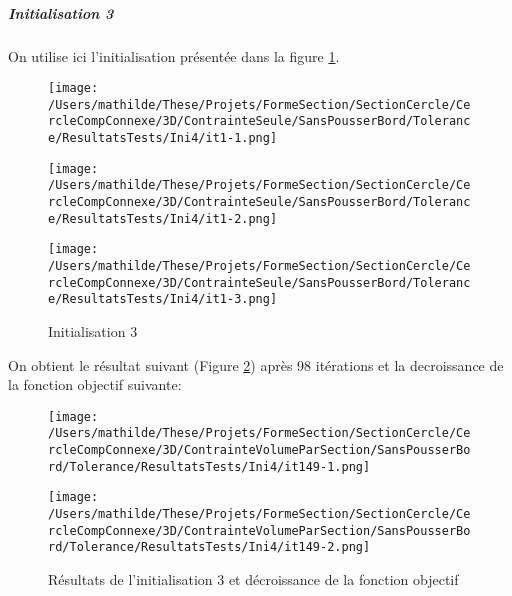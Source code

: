 \documentclass[11pt,a4paper]{article}
\begin{document}
	

\subparagraph{Initialisation 3} On utilise ici l'initialisation présentée dans la figure \ref{fig:cerclevol3Dini3}.

\begin{figure}[H]
	\label{fig:cerclevol3Dini3}
	\begin{minipage}{0.32\textwidth}
		\centering
		\texttt{[image: /Users/mathilde/These/Projets/FormeSection/SectionCercle/CercleCompConnexe/3D/ContrainteSeule/SansPousserBord/Tolerance/ResultatsTests/Ini4/it1-1.png]}
	\end{minipage}
	\begin{minipage}{0.32\textwidth}
		\centering
		\texttt{[image: /Users/mathilde/These/Projets/FormeSection/SectionCercle/CercleCompConnexe/3D/ContrainteSeule/SansPousserBord/Tolerance/ResultatsTests/Ini4/it1-2.png]}
	\end{minipage}
	\begin{minipage}{0.32\textwidth}
		\centering
		\texttt{[image: /Users/mathilde/These/Projets/FormeSection/SectionCercle/CercleCompConnexe/3D/ContrainteSeule/SansPousserBord/Tolerance/ResultatsTests/Ini4/it1-3.png]}
	\end{minipage}	
	\caption{Initialisation 3}	
\end{figure}

On obtient le résultat suivant (Figure \ref{fig:cerclevol3Dini3Fin}) après 98 itérations et la decroissance de la fonction objectif suivante:

\begin{figure}[H]
	\label{fig:cerclevol3Dini3Fin}
	\begin{minipage}{0.45\textwidth}
		\centering
		\texttt{[image: /Users/mathilde/These/Projets/FormeSection/SectionCercle/CercleCompConnexe/3D/ContrainteVolumeParSection/SansPousserBord/Tolerance/ResultatsTests/Ini4/it149-1.png]}
	\end{minipage}	
	\begin{minipage}{0.45\textwidth}
		\centering
		\texttt{[image: /Users/mathilde/These/Projets/FormeSection/SectionCercle/CercleCompConnexe/3D/ContrainteVolumeParSection/SansPousserBord/Tolerance/ResultatsTests/Ini4/it149-2.png]}
	\end{minipage}	
	\caption{Résultats de l'initialisation 3 et décroissance de la fonction objectif}	
\end{figure}
\end{document}
